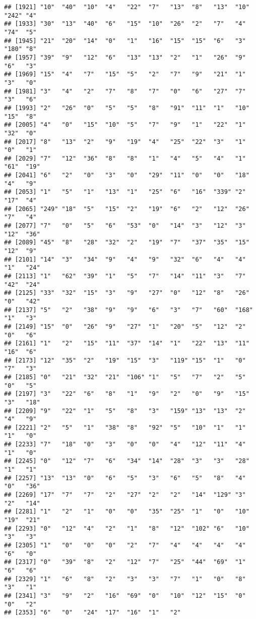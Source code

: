 \documentclass[
]{article}
\begin{document}
\begin{verbatim}
## [1921] "10"  "40"  "10"  "4"   "22"  "7"   "13"  "8"   "13"  "10"  "242" "4"  
## [1933] "30"  "13"  "40"  "6"   "15"  "10"  "26"  "2"   "7"   "4"   "74"  "5"  
## [1945] "21"  "20"  "14"  "0"   "1"   "16"  "15"  "15"  "6"   "3"   "180" "8"  
## [1957] "39"  "9"   "12"  "6"   "13"  "13"  "2"   "1"   "26"  "9"   "6"   "3"  
## [1969] "15"  "4"   "7"   "15"  "5"   "2"   "7"   "9"   "21"  "1"   "3"   "0"  
## [1981] "3"   "4"   "2"   "7"   "8"   "7"   "0"   "6"   "27"  "7"   "3"   "6"  
## [1993] "2"   "26"  "0"   "5"   "5"   "8"   "91"  "11"  "1"   "10"  "15"  "8"  
## [2005] "4"   "0"   "15"  "10"  "5"   "7"   "9"   "1"   "22"  "1"   "32"  "0"  
## [2017] "8"   "13"  "2"   "9"   "19"  "4"   "25"  "22"  "3"   "1"   "0"   "1"  
## [2029] "7"   "12"  "36"  "8"   "8"   "1"   "4"   "5"   "4"   "1"   "61"  "19" 
## [2041] "6"   "2"   "0"   "3"   "0"   "29"  "11"  "0"   "0"   "18"  "4"   "9"  
## [2053] "1"   "5"   "1"   "13"  "1"   "25"  "6"   "16"  "339" "2"   "17"  "4"  
## [2065] "249" "18"  "5"   "15"  "2"   "19"  "6"   "2"   "12"  "26"  "7"   "4"  
## [2077] "7"   "0"   "5"   "6"   "53"  "0"   "14"  "3"   "12"  "3"   "12"  "36" 
## [2089] "45"  "8"   "28"  "32"  "2"   "19"  "7"   "37"  "35"  "15"  "12"  "9"  
## [2101] "14"  "3"   "34"  "9"   "4"   "9"   "32"  "6"   "4"   "4"   "1"   "24" 
## [2113] "1"   "62"  "39"  "1"   "5"   "7"   "14"  "11"  "3"   "7"   "42"  "24" 
## [2125] "33"  "32"  "15"  "3"   "9"   "27"  "0"   "12"  "8"   "26"  "0"   "42" 
## [2137] "5"   "2"   "38"  "9"   "9"   "6"   "3"   "7"   "60"  "168" "1"   "3"  
## [2149] "15"  "0"   "26"  "9"   "27"  "1"   "20"  "5"   "12"  "2"   "0"   "6"  
## [2161] "1"   "2"   "15"  "11"  "37"  "14"  "1"   "22"  "13"  "11"  "16"  "6"  
## [2173] "12"  "35"  "2"   "19"  "15"  "3"   "119" "15"  "1"   "0"   "7"   "3"  
## [2185] "0"   "21"  "32"  "21"  "106" "1"   "5"   "7"   "2"   "5"   "0"   "5"  
## [2197] "3"   "22"  "6"   "8"   "1"   "9"   "2"   "0"   "9"   "15"  "3"   "18" 
## [2209] "9"   "22"  "1"   "5"   "8"   "3"   "159" "13"  "13"  "2"   "4"   "9"  
## [2221] "2"   "5"   "1"   "38"  "8"   "92"  "5"   "10"  "1"   "1"   "1"   "0"  
## [2233] "7"   "18"  "0"   "3"   "0"   "0"   "4"   "12"  "11"  "4"   "1"   "0"  
## [2245] "0"   "12"  "7"   "6"   "34"  "14"  "28"  "3"   "3"   "28"  "1"   "1"  
## [2257] "13"  "13"  "0"   "6"   "5"   "3"   "6"   "5"   "8"   "4"   "0"   "36" 
## [2269] "17"  "7"   "7"   "2"   "27"  "2"   "2"   "14"  "129" "3"   "2"   "14" 
## [2281] "1"   "2"   "1"   "0"   "0"   "35"  "25"  "1"   "0"   "10"  "19"  "21" 
## [2293] "0"   "12"  "4"   "2"   "1"   "8"   "12"  "102" "6"   "10"  "3"   "3"  
## [2305] "1"   "0"   "0"   "0"   "2"   "7"   "4"   "4"   "4"   "4"   "6"   "0"  
## [2317] "0"   "39"  "8"   "2"   "12"  "7"   "25"  "44"  "69"  "1"   "6"   "6"  
## [2329] "1"   "6"   "8"   "2"   "3"   "3"   "7"   "1"   "0"   "8"   "3"   "1"  
## [2341] "3"   "9"   "2"   "16"  "69"  "0"   "10"  "12"  "15"  "0"   "0"   "2"  
## [2353] "6"   "0"   "24"  "17"  "16"  "1"   "2"
\end{verbatim}
\end{document}
